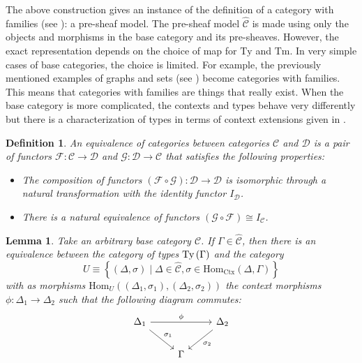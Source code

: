 \documentclass[12pt,a4paper,twoside,xetex]{book} %
\newcommand{\keyword}[1]{\emph{#1}\index{#1}}
\newtheorem{lemma}[theorem]{Lemma}
\newtheorem{definition}[theorem]{Definition}
\newcommand{\psh}[1]{\widehat{#1}}
\newcommand{\homo}[3]{\text{Hom}_{#1}\left(#2,#3\right)}
\begin{document}
The above construction gives an instance of the definition of a category with 
families (see ): a pre-sheaf model. The pre-sheaf model $\psh{\mathcal{C}}$ is made using only the 
objects and morphisms in the base category and its pre-sheaves. However, the 
exact representation depends on the choice of map for $\text{Ty}$ and 
$\text{Tm}$. In very simple cases of base categories, the choice is limited. 
For example, the previously mentioned examples of graphs and sets (see ) become 
categories with families. This means that categories with families are things 
that really exist. When the base category is more complicated, the contexts and 
types behave very differently but there is a characterization of types in terms 
of context extensions given in .

\begin{definition}
An \keyword{equivalence of categories} between categories $\mathcal{C}$ and 
$\mathcal{D}$ is a pair of functors $\mathcal{F}:\mathcal{C} \rightarrow 
\mathcal{D}$ and $\mathcal{G}:\mathcal{D} \rightarrow \mathcal{C}$ that 
satisfies the following properties:
\begin{itemize}

\item The composition of functors $(\mathcal{F} \circ \mathcal{G}) : 
\mathcal{D} \rightarrow \mathcal{D}$ is isomorphic through a natural 
transformation with the identity functor $I_{\mathcal{D}}$. 

\item There is a natural equivalence of functors $(\mathcal{G} \circ 
\mathcal{F}) \cong I_{\mathcal{C}}$.
\end{itemize} 
\end{definition}

\begin{lemma}\label{typelemma}
Take an arbitrary base category $\mathcal{C}$. If $\Gamma \in 
\psh{\mathcal{C}}$, then there is an equivalence between the  category of types 
$\text{Ty}\left(\Gamma\right)$ and the category $$ U \equiv \left\{ (\Delta, \sigma) \mid \Delta 
\in \psh{\mathcal{C}}, \sigma \in \text{Hom}_{\text{Ctx}}(\Delta , \Gamma) 
\right\}$$ with as morphisms $\homo{U}{(\Delta_1, \sigma_1)}{(\Delta_2, 
\sigma_2)}$ the context morphisms $\phi: \Delta _1 \rightarrow \Delta _2$ such 
that the following diagram commutes: 
\[ \begin{tikzcd}
\Delta_1 \arrow[dr, "\sigma_1"] \arrow[rr, "\phi"]
& & \Delta_2
\arrow[dl, "\sigma_2"] \\
& \Gamma 
\end{tikzcd}
\]

\end{lemma}
\end{document}
